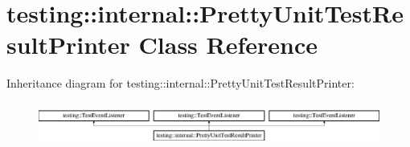 \hypertarget{classtesting_1_1internal_1_1_pretty_unit_test_result_printer}{}\section{testing\+::internal\+::Pretty\+Unit\+Test\+Result\+Printer Class Reference}
\label{classtesting_1_1internal_1_1_pretty_unit_test_result_printer}
Inheritance diagram for testing\+::internal\+::Pretty\+Unit\+Test\+Result\+Printer\+:\begin{figure}[H]
\begin{center}
\leavevmode
\includegraphics[height=1.441442cm]{d7/d8b/classtesting_1_1internal_1_1_pretty_unit_test_result_printer}
\end{center}
\end{figure}
